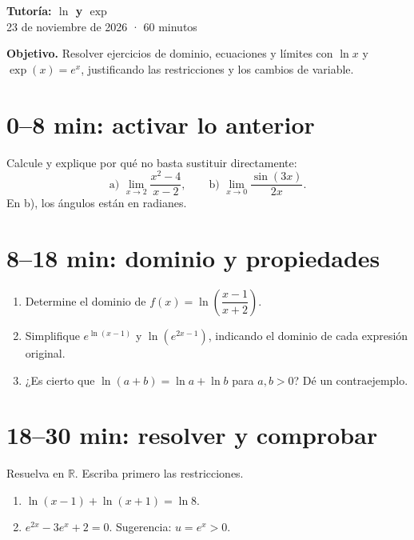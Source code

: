 \documentclass[10pt,a5paper]{article}
\begin{document}
\begin{center}
  {\large\bfseries\color{Azul} Tutoría: $\ln$ y $\exp$}\\[3pt]
  23 de noviembre de 2026 · 60 minutos
\end{center}

\textbf{Objetivo.} Resolver ejercicios de dominio, ecuaciones y límites con $\ln x$ y $\exp(x)=e^x$, justificando las restricciones y los cambios de variable.

\section*{0--8 min: activar lo anterior}
\begin{ejercicios}
Calcule y explique por qué no basta sustituir directamente:
\[
 \text{a) }\lim_{x\to2}\frac{x^2-4}{x-2},
 \qquad
 \text{b) }\lim_{x\to0}\frac{\sin(3x)}{2x}.
\]
En b), los ángulos están en radianes.
\end{ejercicios}

\section*{8--18 min: dominio y propiedades}
\begin{ejercicios}
\begin{enumerate}
  \item Determine el dominio de $f(x)=\ln\!\left(\dfrac{x-1}{x+2}\right)$.
  \item Simplifique $e^{\ln(x-1)}$ y $\ln(e^{2x-1})$, indicando el dominio de cada expresión original.
  \item ¿Es cierto que $\ln(a+b)=\ln a+\ln b$ para $a,b>0$? Dé un contraejemplo.
\end{enumerate}
\end{ejercicios}

\section*{18--30 min: resolver y comprobar}
\begin{ejercicios}[ecuaciones]
Resuelva en $\mathbb R$. Escriba primero las restricciones.
\begin{enumerate}
  \item $\ln(x-1)+\ln(x+1)=\ln 8$.
  \item $e^{2x}-3e^x+2=0$. Sugerencia: $u=e^x>0$.
\end{enumerate}
\end{ejercicios}
\end{document}
